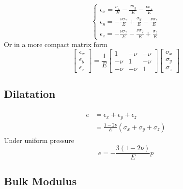 \documentclass[twoside]{article}
\begin{document}
	\begin{equation}
		\begin{cases}
			\epsilon_x = \frac{\sigma_x}{E}-\frac{\nu \sigma_y}{E}-\frac{\nu \sigma_z}{E} \\
			\epsilon_y = -\frac{\nu \sigma_x}{E}+\frac{\sigma_y}{E}-\frac{\nu \sigma_z}{E} \\
			\epsilon_z = -\frac{\nu \sigma_x}{E}-\frac{\nu \sigma_y}{E}+\frac{\sigma_z}{E}
		\end{cases}
		\label{GeneralisedHookesLaw}
	\end{equation}
	Or in a more compact matrix form
	\begin{equation}
		\begin{bmatrix}
			\epsilon_x \\
			\epsilon_y \\
			\epsilon_z
		\end{bmatrix}
		= \frac{1}{E}
		\begin{bmatrix}
			1 & -\nu & -\nu \\
			-\nu & 1 & -\nu \\
			-\nu & -\nu & 1
		\end{bmatrix}
		\begin{bmatrix}
			\sigma_x \\
			\sigma_y \\
			\sigma_z
		\end{bmatrix}
		\label{eq:GeneralisedHookesLawMatrix}
	\end{equation}
	
	\subsection{Dilatation}
	
	\begin{align}
		\begin{split}
			e &= \epsilon_x+\epsilon_y+\epsilon_z \\
			  &= \frac{1-2\nu}{E} (\sigma_x+\sigma_y+\sigma_z)
			  \label{eq:Dilataion}
		\end{split}
	\end{align}
	Under uniform pressure
	\begin{equation}
		e = -\frac{3(1-2\nu)}{E} p
		\label{eq:DilatationPressure}
	\end{equation}
	
	\subsection{Bulk Modulus}
	
\end{document}
